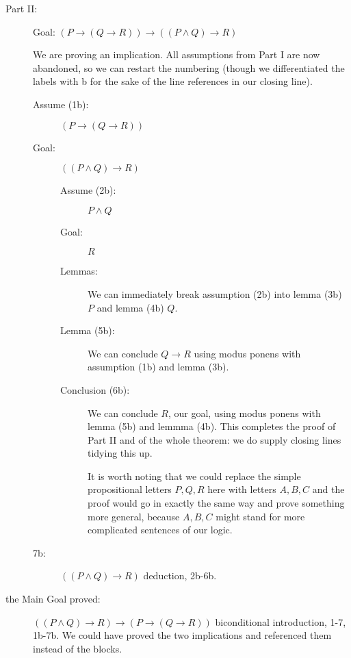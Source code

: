 \documentclass[12pt]{article}
\begin{document}
\begin{description}
\begin{description}

\end{description}

\newpage

\item[Part II:] Goal:  $(P \rightarrow (Q \rightarrow R))
\rightarrow ((P \wedge Q) \rightarrow R)$

We are proving an implication.  All assumptions from Part I
are now abandoned, so we can restart the numbering (though we differentiated the labels with b for the sake of the line references
in our closing line).

\begin{description}

\item[Assume (1b):]  $(P \rightarrow (Q \rightarrow R))$

\item[Goal:]  $((P \wedge Q) \rightarrow R)$

\begin{description}

\item[Assume (2b):]  $P \wedge Q$

\item[Goal:]  $R$

\item[Lemmas:]  We can immediately break assumption (2b) into lemma (3b) $P$
and lemma (4b) $Q$.

\item[Lemma (5b):]  We can conclude $Q \rightarrow R$ using modus ponens with
assumption (1b) and lemma (3b).  

\item[Conclusion (6b):] We can conclude $R$, our goal, using modus ponens
with lemma (5b) and lemmma (4b).  This completes the proof of Part II
and of the whole theorem:  we do supply closing lines tidying this up.

It is worth noting that we could replace the simple propositional letters $P,Q,R$ here with letters $A,B,C$ and the proof would go in exactly the same way and prove something more general, because $A,B,C$ might stand for more complicated sentences of our logic.


\end{description}

\item[7b:]  $((P \wedge Q) \rightarrow R)$  deduction, 2b-6b.


\end{description}

\item[the Main Goal proved:]  $((P \wedge Q) \rightarrow R) \rightarrow (P \rightarrow (Q
\rightarrow R))$  biconditional introduction, 1-7, 1b-7b.   We could have proved the two implications and referenced them instead of the blocks.
\end{description}
\end{document}
